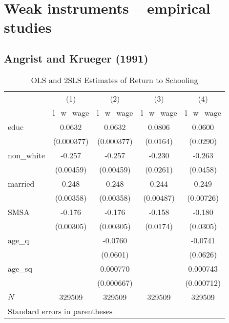 \documentclass[12pt]{article}
\begin{document}
\newpage

\section{Weak instruments -- empirical studies}

\subsection{Angrist and Krueger (1991)}
\begin{table}[htpb!]
\centering
\caption{OLS and 2SLS Estimates of Return to Schooling}
\begin{tabular}{l*{4}{c}}
\hline
            &\multicolumn{1}{c}{(1)}&\multicolumn{1}{c}{(2)}&\multicolumn{1}{c}{(3)}&\multicolumn{1}{c}{(4)}\\
            &\multicolumn{1}{c}{l\_w\_wage}&\multicolumn{1}{c}{l\_w\_wage}&\multicolumn{1}{c}{l\_w\_wage}&\multicolumn{1}{c}{l\_w\_wage}\\
\hline
educ        &      0.0632&      0.0632&      0.0806&      0.0600\\
            &  (0.000377)&  (0.000377)&    (0.0164)&    (0.0290)\\
[1em]
non\_white   &      -0.257&      -0.257&      -0.230&      -0.263\\
            &   (0.00459)&   (0.00459)&    (0.0261)&    (0.0458)\\
[1em]
married     &       0.248&       0.248&       0.244&       0.249\\
            &   (0.00358)&   (0.00358)&   (0.00487)&   (0.00726)\\
[1em]
SMSA        &      -0.176&      -0.176&      -0.158&      -0.180\\
            &   (0.00305)&   (0.00305)&    (0.0174)&    (0.0305)\\
[1em]
age\_q       &            &     -0.0760&            &     -0.0741\\
            &            &    (0.0601)&            &    (0.0626)\\
[1em]
age\_sq      &            &    0.000770&            &    0.000743\\
            &            &  (0.000667)&            &  (0.000712)\\
\hline
\(N\)       &      329509&      329509&      329509&      329509\\
\hline
\multicolumn{5}{l}{\footnotesize Standard errors in parentheses}\\
\end{tabular}
\end{table}
\end{document}
